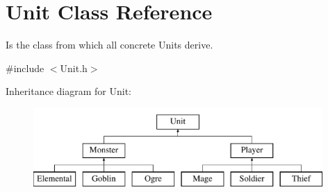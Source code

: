 \hypertarget{class_unit}{}\section{Unit Class Reference}
\label{class_unit}


Is the class from which all concrete Units derive.  




{\ttfamily \#include $<$Unit.\+h$>$}

Inheritance diagram for Unit\+:\begin{figure}[H]
\begin{center}
\leavevmode
\includegraphics[height=3.000000cm]{class_unit}
\end{center}
\end{figure}
